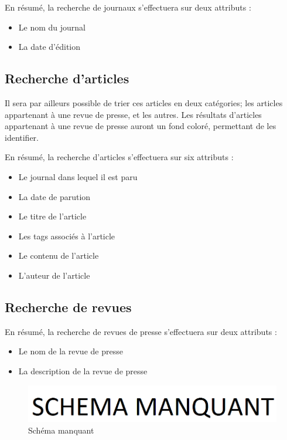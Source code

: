 En résumé, la recherche de journaux s'effectuera sur deux attributs :
\begin{itemize}
	\item Le nom du journal
	\item La date d'édition
\end{itemize}

\subsection{Recherche d'articles}
\label{sec:recherche_article}


Il sera par ailleurs possible de trier ces articles en deux catégories; les articles appartenant à une revue de presse, et les autres. Les résultats d'articles appartenant à une revue de presse auront un fond coloré, permettant de les identifier.

En résumé, la recherche d'articles s'effectuera sur six attributs :
\begin{itemize}
	\item Le journal dans lequel il est paru
	\item La date de parution
	\item Le titre de l'article
	\item Les tags associés à l'article
	\item Le contenu de l'article
	\item L'auteur de l'article
\end{itemize}



\subsection{Recherche de revues}
\label{sec:recherche_revue}

En résumé, la recherche de revues de presse s'effectuera sur deux attributs :
\begin{itemize}
	\item Le nom de la revue de presse
	\item La description de la revue de presse
\end{itemize}

    \begin{figure}[H]
        \centering
        \includegraphics[width=\textwidth]{figures/manquant.png}
            \caption{Schéma manquant}
            \label{fig:manquant}
    \end{figure}